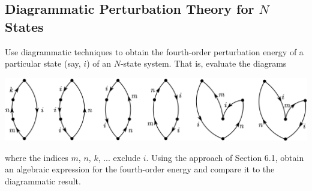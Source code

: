 \documentclass[a4paper]{book}
\newcounter{exercise}[chapter]
\begin{document}
	\subsection{Diagrammatic Perturbation Theory for \texorpdfstring{$N$}- States}
	
	\begin{exercise}
	Use diagrammatic techniques to obtain the fourth-order perturbation energy of a particular state (say, $i$) of an $N$-state system. That is, evaluate the diagrams
	\begin{center}
	\includegraphics[scale=1.0]{./pictures/6.02/exercise.png}
	\end{center}
	where the indices $m$, $n$, $k$, ... exclude $i$. Using the approach of Section 6.1, obtain an algebraic expression for the fourth-order energy and compare it to the diagrammatic result.
	
	\end{exercise}
	
\end{document}
